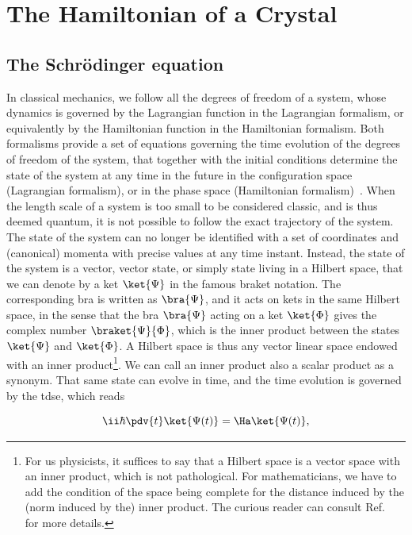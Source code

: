 \section{The Hamiltonian of a Crystal}
\label{sec:crystal_hamiltonian}

\subsection{The Schr\"{o}dinger equation}
\label{subsec:schrodinger_equation}

In classical mechanics, we follow all the degrees of freedom of a system, whose dynamics is governed by the Lagrangian function in the Lagrangian formalism, or equivalently by the Hamiltonian function in the Hamiltonian formalism.
Both formalisms provide a set of equations governing the time evolution of the degrees of freedom of the system, that together with the initial conditions determine the state of the system at any time in the future in the configuration space (Lagrangian formalism), or in the phase space (Hamiltonian formalism)~\cite{goldstein:mechanics}.
When the length scale of a system is too small to be considered classic, and is thus deemed quantum, it is not possible to follow the exact trajectory of the system.
The state of the system can no longer be identified with a set of coordinates and (canonical) momenta with precise values at any time instant.
Instead, the state of the system is a vector, vector state, or simply state living in a Hilbert space, that we can denote by a ket $\ket{\Psi}$ in the famous braket notation.
The corresponding bra is written as $\bra{\Psi}$, and it acts on kets in the same Hilbert space, in the sense that the bra $\bra{\Psi}$ acting on a ket $\ket{\Phi}$ gives the complex number $\braket{\Psi}{\Phi}$, which is the inner product between the states $\ket{\Psi}$ and $\ket{\Phi}$.
A Hilbert space is thus any vector linear space endowed with an inner product\footnote{For us physicists, it suffices to say that a Hilbert space is a vector space with an inner product, which is not pathological. For mathematicians, we have to add the condition of the space being complete for the distance induced by the (norm induced by the) inner product. The curious reader can consult Ref.~\cite{Kreyszig_1991} for more details.}.
We can call an inner product also a scalar product as a synonym.
That same state can evolve in time, and the time evolution is governed by the \gls{tdse}, which reads~\cite{Griffiths_QM_2018,Sakurai}

\begin{equation}
    \label{eq:time_dependent_Schrodinger_equation}
    \ii \hbar \pdv{t} \ket{\Psi(t)} = \Ha \ket{\Psi(t)},
\end{equation}

